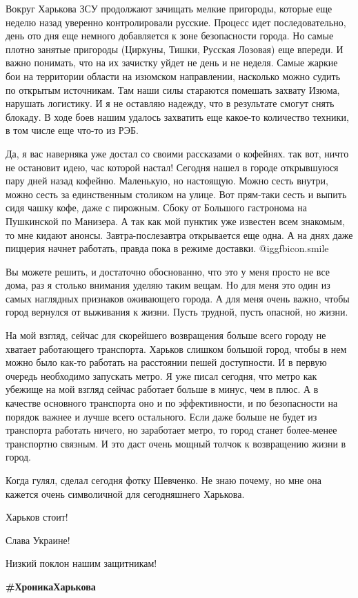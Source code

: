Вокруг Харькова ЗСУ продолжают зачищать мелкие пригороды, которые еще неделю
назад уверенно контролировали русские. Процесс идет последовательно, день ото
дня еще немного добавляется к зоне безопасности города. Но самые плотно занятые
пригороды (Циркуны, Тишки, Русская Лозовая) еще впереди. И важно понимать, что
на их зачистку уйдет не день и не неделя. Самые жаркие бои на территории
области на изюмском направлении, насколько можно судить по открытым источникам.
Там наши силы стараются помешать захвату Изюма, нарушать логистику. И я не
оставляю надежду, что в результате смогут снять блокаду. В ходе боев нашим
удалось захватить еще какое-то количество техники, в том числе еще что-то из
РЭБ.

Да, я вас наверняка уже достал со своими рассказами о кофейнях. так вот, ничто
не остановит идею, час которой настал! Сегодня нашел в городе открывшуюся пару
дней назад кофейню. Маленькую, но настоящую. Можно сесть внутри, можно сесть за
единственным столиком на улице. Вот прям-таки сесть и выпить сидя чашку кофе,
даже с пирожным. Сбоку от Большого гастронома на Пушкинской по Манизера. А так
как мой пунктик уже известен всем знакомым, то мне кидают анонсы.
Завтра-послезавтра открывается еще одна. А на днях даже пиццерия начнет
работать, правда пока в режиме доставки.  @igg{fbicon.smile} 

Вы можете решить, и достаточно обоснованно, что это у меня просто не все дома,
раз я столько внимания уделяю таким вещам. Но для меня это один из самых
наглядных признаков оживающего города. А для меня очень важно, чтобы город
вернулся от выживания к жизни. Пусть трудной, пусть опасной, но жизни. 

На мой взгляд, сейчас для скорейшего возвращения больше всего городу не хватает
работающего транспорта. Харьков слишком большой город, чтобы в нем можно было
как-то работать на расстоянии пешей доступности. И в первую очередь необходимо
запускать метро. Я уже писал сегодня, что метро как убежище на мой взгляд
сейчас работает больше в минус, чем в плюс. А в качестве основного транспорта
оно и по эффективности, и по безопасности на порядок важнее и лучше всего
остального. Если даже больше не будет из транспорта работать ничего, но
заработает метро, то город станет более-менее транспортно связным. И это даст
очень мощный толчок к возвращению жизни в город. 

Когда гулял, сделал сегодня фотку Шевченко. Не знаю почему, но мне она кажется
очень символичной для сегодняшнего Харькова. 

Харьков стоит!

Слава Украине! 

Низкий поклон нашим защитникам!

\textbf{\#ХроникаХарькова}

